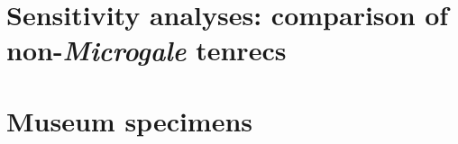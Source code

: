 \documentclass[12pt,a4paper]{article}
\begin{document}
\section{Sensitivity analyses: comparison of non-\textit{Microgale} tenrecs}


\section{Museum specimens}




\end{document}
